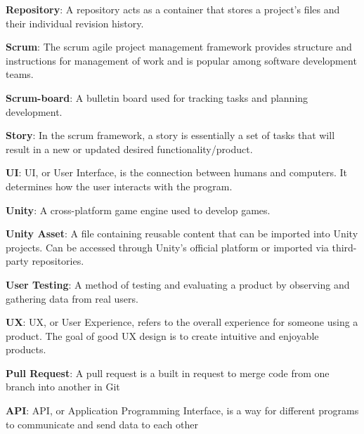 \noindent
\label{itm:repository}\textbf{Repository}: A repository acts as a container that stores a project's files and their individual revision history.

\noindent
\label{itm:scrum}\textbf{Scrum}: The scrum agile project management framework provides structure and instructions for management of work and is popular among software development teams.

\noindent 
\label{itm:scrum-boards}\textbf{Scrum-board}: A bulletin board used for tracking tasks and planning development.

\noindent
\label{itm:story}\textbf{Story}: In the scrum framework, a story is essentially a set of tasks that will result in a new or updated desired functionality/product.  

\noindent
\label{itm:ui}\textbf{UI}: UI, or User Interface, is the connection between humans and computers. It determines how the user interacts with the program.

\noindent
\label{itm:unity}\textbf{Unity}: A cross-platform game engine used to develop games.

\noindent
\label{itm:unity-asset}\textbf{Unity Asset}: A file  containing reusable content that can be imported into Unity projects. Can be accessed through Unity's official platform or imported via third-party repositories. 

\noindent
\label{itm:user-testing}\textbf{User Testing}: A method of testing and evaluating a product by observing and gathering data from real users. 

\noindent
\label{itm:ux}\textbf{UX}: UX, or User Experience, refers to the overall experience for someone using a product. The goal of good UX design is to create intuitive and enjoyable products.

\noindent
\label{itm:pr}\textbf{Pull Request}: A pull request is a built in request to merge code from one branch into another in Git

\noindent
\label{itm:api}\textbf{API}: API, or Application Programming Interface, is a way for different programs to communicate and send data to each other

